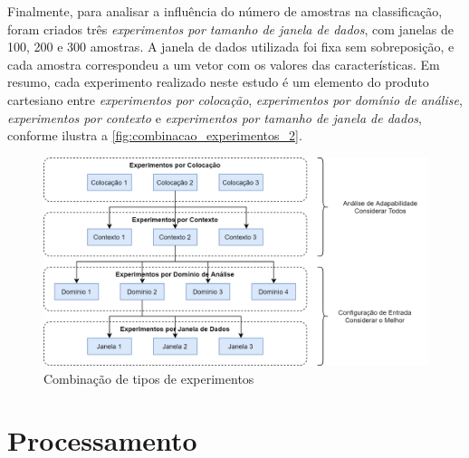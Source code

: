 Finalmente, para analisar a influência do número de amostras na classificação, foram criados três \emph{experimentos por tamanho de janela de dados}, com janelas de 100, 200 e 300 amostras. A janela de dados utilizada foi fixa sem sobreposição, e cada amostra correspondeu a um vetor com os valores das características. Em resumo, cada experimento realizado neste estudo é um elemento do produto cartesiano entre \emph{experimentos por colocação}, \emph{experimentos por domínio de análise}, \emph{experimentos por contexto} e \emph{experimentos por tamanho de janela de dados}, conforme ilustra a \autoref{fig:combinacao_experimentos_2}.

\begin{figure}[h!]
  \centering
  \caption{Combinação de tipos de experimentos}
  \label{fig:combinacao_experimentos_2}
  \includegraphics[width=1\textwidth]{figuras/fig_36_1.png}
\end{figure}

\section{Processamento}

